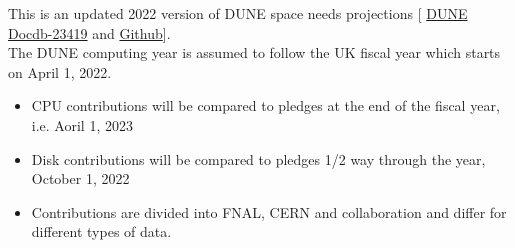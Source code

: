 This is an updated 2022 version of DUNE space needs projections [
\href{https://docs.dunescience.org/cgi-bin/sso/ShowDocument?docid=23419}{DUNE Docdb-23419} and \href{https://github.com/DUNE/Computing-CDR/tree/master/Jupyter/Numbers}{Github}].\\

The DUNE computing year is assumed to follow the UK fiscal year which starts on April 1, 2022. \\

\begin{itemize}
\item CPU contributions will be compared to pledges at the end of the fiscal year, i.e. Aoril 1, 2023

\item Disk contributions will be compared to pledges 1/2 way through the year, October 1, 2022

\item Contributions are divided into FNAL, CERN and collaboration and differ for different types of data. 

\end{itemize}
\pagebreak
